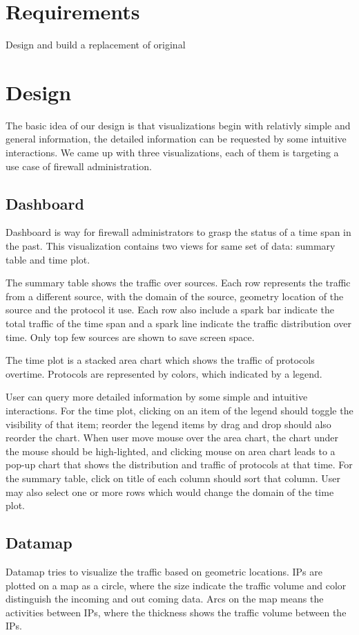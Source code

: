\section{Requirements}
Design and build a replacement of original
\section{Design}
The basic idea of our design is that visualizations begin with relativly simple and general information, the detailed information can be requested by some intuitive interactions. We came up with three visualizations, each of them is targeting a use case of firewall administration. 
\subsection{Dashboard}
Dashboard is way for firewall administrators to grasp the status of a time span in the past. This visualization contains two views for same set of data: summary table and time plot.

The summary table shows the traffic over sources. Each row represents the traffic from a different source, with the domain of the source, geometry location of the source and the protocol it use. Each row also include a spark bar indicate the total traffic of the time span and a spark line indicate the traffic distribution over time. Only top few sources are shown to save screen space.

The time plot is a stacked area chart which shows the traffic of protocols overtime. Protocols are represented by colors, which indicated by a legend.

User can query more detailed information by some simple and intuitive interactions. For the time plot, clicking on an item of the legend should toggle the visibility of that item; reorder the legend items by drag and drop should also reorder the chart. When user move mouse over the area chart, the chart under the mouse should be high-lighted, and clicking mouse on area chart leads to a pop-up chart that shows the distribution and traffic of protocols at that time. For the summary table, click on title of each column should sort that column. User may also select one or more rows which would change the domain of the time plot.

\subsection{Datamap}
Datamap tries to visualize the traffic based on geometric locations. IPs are plotted on a map as a circle, where the size indicate the traffic volume and color distinguish the incoming and out coming data. Arcs on the map means the activities between IPs, where the thickness shows the traffic volume between the IPs.

